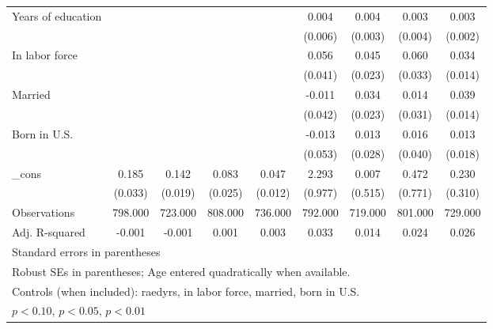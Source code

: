 \begin{table}[htbp]
\begin{tabular}{l*{8}{c}}
Years of education&                  &                  &                  &                  &    0.004         &    0.004         &    0.003         &    0.003\sym{*}  \\
          &                  &                  &                  &                  &  (0.006)         &  (0.003)         &  (0.004)         &  (0.002)         \\
In labor force&                  &                  &                  &                  &    0.056         &    0.045\sym{*}  &    0.060\sym{*}  &    0.034\sym{**} \\
          &                  &                  &                  &                  &  (0.041)         &  (0.023)         &  (0.033)         &  (0.014)         \\
Married   &                  &                  &                  &                  &   -0.011         &    0.034         &    0.014         &    0.039\sym{***}\\
          &                  &                  &                  &                  &  (0.042)         &  (0.023)         &  (0.031)         &  (0.014)         \\
Born in U.S.&                  &                  &                  &                  &   -0.013         &    0.013         &    0.016         &    0.013         \\
          &                  &                  &                  &                  &  (0.053)         &  (0.028)         &  (0.040)         &  (0.018)         \\
\_cons    &    0.185\sym{***}&    0.142\sym{***}&    0.083\sym{***}&    0.047\sym{***}&    2.293\sym{**} &    0.007         &    0.472         &    0.230         \\
          &  (0.033)         &  (0.019)         &  (0.025)         &  (0.012)         &  (0.977)         &  (0.515)         &  (0.771)         &  (0.310)         \\
\midrule
Observations&  798.000         &  723.000         &  808.000         &  736.000         &  792.000         &  719.000         &  801.000         &  729.000         \\
Adj. R-squared&   -0.001         &   -0.001         &    0.001         &    0.003         &    0.033         &    0.014         &    0.024         &    0.026         \\
\bottomrule
\multicolumn{9}{l}{\footnotesize Standard errors in parentheses}\\
\multicolumn{9}{l}{\footnotesize Robust SEs in parentheses; Age entered quadratically when available.}\\
\multicolumn{9}{l}{\footnotesize Controls (when included): raedyrs, in labor force, married, born in U.S.}\\
\multicolumn{9}{l}{\footnotesize \sym{*} \(p<0.10\), \sym{**} \(p<0.05\), \sym{***} \(p<0.01\)}\\
\end{tabular}
\end{table}
